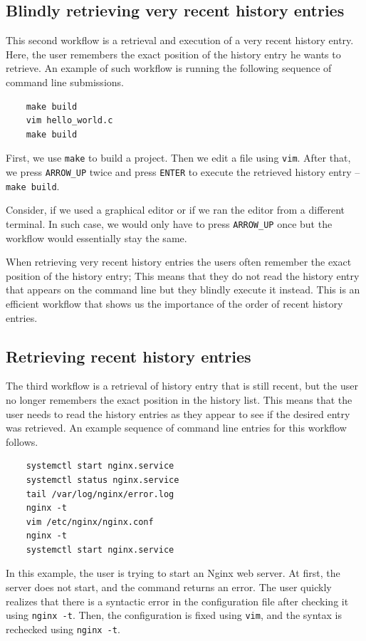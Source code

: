 \subsection{Blindly retrieving very recent history entries}\label{workflow-blind-retrieval}

This second workflow is a retrieval and execution of a very recent history entry. Here, the user remembers the exact position of the history entry he wants to retrieve. An example of such workflow is running the following sequence of command line submissions.
\begin{verbatim}
    make build
    vim hello_world.c
    make build
\end{verbatim}
First, we use \verb|make| to build a project. Then we edit a file using \verb|vim|. After that, we press \verb|ARROW_UP| twice and press \verb|ENTER| to execute the retrieved history entry -- \verb|make build|. 


Consider, if we used a graphical editor or if we ran the editor from a different terminal. In such case, we would only have to press \verb|ARROW_UP| once but the workflow would essentially stay the same.

When retrieving very recent history entries the users often remember the exact position of the history entry; This means that they do not read the history entry that appears on the command line but they blindly execute it instead. This is an efficient workflow that shows us the importance of the order of recent history entries.

\subsection{Retrieving recent history entries}\label{workflow-recent-history-arrow-up}
The third workflow is a retrieval of history entry that is still recent, but the user no longer remembers the exact position in the history list. This means that the user needs to read the history entries as they appear to see if the desired entry was retrieved. An example sequence of command line entries for this workflow follows.

\begin{verbatim}
    systemctl start nginx.service
    systemctl status nginx.service
    tail /var/log/nginx/error.log
    nginx -t
    vim /etc/nginx/nginx.conf
    nginx -t
    systemctl start nginx.service
\end{verbatim}

In this example, the user is trying to start an Nginx \cite{reese2008nginx} web server. At first, the server does not start, and the command returns an error. The user quickly realizes that there is a syntactic error in the configuration file after checking it using \verb|nginx -t|. Then, the configuration is fixed using \verb|vim|, and the syntax is rechecked using \verb|nginx -t|. 

